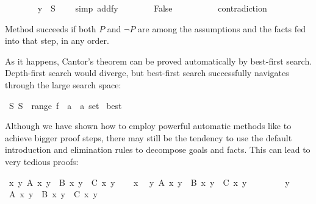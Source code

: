 \begin{isabellebody}
\ \ \ \ \ \ \isamarkupfalse%
\ {\isachardoublequote}y\ {\isasymin}\ {\isacharquery}S{\isachardoublequote}\ \ \ \ \isamarkupfalse%
simp\ add{\isacharcolon}fy{\isacharparenright}\isanewline
\ \ \ \ \ \ \isamarkupfalse%
\ False\ \ \ \ \ \ \ \ \ \isamarkupfalse%
\ contradiction\isanewline
\ \ \ \ \isamarkupfalse%
\isanewline
\ \ \isamarkupfalse%
\isanewline
\isamarkupfalse%
\isamarkupfalse%
%
\begin{isamarkuptext}%
\noindent Method  succeeds if both $P$ and
$\neg P$ are among the assumptions and the facts fed into that step, in any order.

As it happens, Cantor's theorem can be proved automatically by best-first
search. Depth-first search would diverge, but best-first search successfully
navigates through the large search space:%
\end{isamarkuptext}%
\isamarkuptrue%
\ {\isachardoublequote}{\isasymexists}S{\isachardot}\ S\ {\isasymnotin}\ range\ {\isacharparenleft}f\ {\isacharcolon}{\isacharcolon}\ {\isacharprime}a\ {\isasymRightarrow}\ {\isacharprime}a\ set{\isacharparenright}{\isachardoublequote}\isanewline
\isamarkupfalse%
\ best\isamarkupfalse%
%
\isamarkuptrue%
%
\begin{isamarkuptext}%
Although we have shown how to employ powerful automatic methods like
 to achieve bigger proof steps, there may still be the
tendency to use the default introduction and elimination rules to
decompose goals and facts. This can lead to very tedious proofs:%
\end{isamarkuptext}%
\isamarkuptrue%
\isamarkupfalse%
\ {\isachardoublequote}{\isasymforall}x\ y{\isachardot}\ A\ x\ y\ {\isasymand}\ B\ x\ y\ {\isasymlongrightarrow}\ C\ x\ y{\isachardoublequote}\isanewline
\isamarkupfalse%
\isanewline
\ \ \isamarkupfalse%
\ x\ \isamarkupfalse%
\ {\isachardoublequote}{\isasymforall}y{\isachardot}\ A\ x\ y\ {\isasymand}\ B\ x\ y\ {\isasymlongrightarrow}\ C\ x\ y{\isachardoublequote}\isanewline
\ \ \isamarkupfalse%
\isanewline
\ \ \ \ \isamarkupfalse%
\ y\ \isamarkupfalse%
\ {\isachardoublequote}A\ x\ y\ {\isasymand}\ B\ x\ y\ {\isasymlongrightarrow}\ C\ x\ y{\isachardoublequote}\isanewline
\ \ \ \ \isamarkupfalse%
\isanewline

\end{isabellebody}

